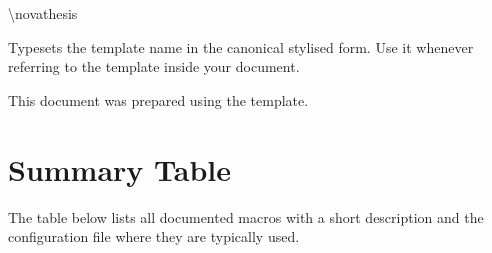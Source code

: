 \begin{macrodoc}{\textbackslash novathesis}

Typesets the template name \novathesis{} in the canonical stylised
form.  Use it whenever referring to the template inside your
document.

\begin{latexcode}
This document was prepared using the \novathesis{} template.
\end{latexcode}
\end{macrodoc}

\section{Summary Table}
\label{sec:int_summary}

The table below lists all documented macros with a short description
and the configuration file where they are typically used.

